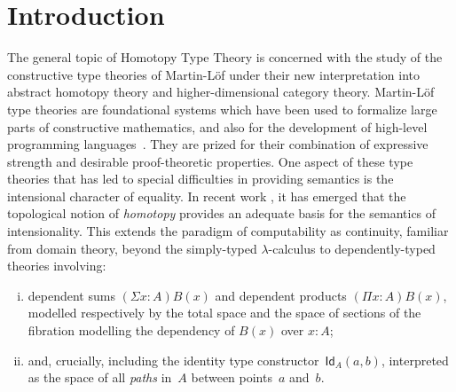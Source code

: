 \documentclass[11pt]{article}
\newcommand{\Id}{\mathsf{Id}}
\newcommand{\id}[1]{\Id_{#1}}
\theoremstyle{definition}
\begin{document}
\maketitle

\section{Introduction}


The general topic of Homotopy Type Theory is concerned with the study of the constructive type theories of Martin-L\"of under their new interpretation into abstract homotopy theory and higher-dimensional category theory. Martin-L\"of type theories are foundational systems which have been used to formalize large parts of constructive mathematics, and also for the development of high-level programming languages~\cite{MartinLofP:conmcp}.  They are prized for their combination of expressive strength and desirable proof-theoretic properties.  One aspect of these type theories that has led to special difficulties in providing semantics is the intensional character of equality.  In recent work \cite{AwodeyS:homtmi,VoevodskyV:notts,vandenBergB:topsmi,AwodeyS:typth}, it has emerged that the topological notion of \emph{homotopy} provides an adequate basis for the semantics of intensionality.  This extends the paradigm of computability as continuity, familiar from domain theory, beyond the simply-typed 
$\lambda$-calculus to dependently-typed theories involving:\begin{enumerate}[(i)]
\item dependent sums $(\Sigma x\colon\!{A})B(x)$ and dependent products $(\Pi x\colon\!{A})B(x)$, modelled respectively by the total space and the space of sections of the fibration modelling the dependency of $B(x)$ over $ x : A$; \item
and, crucially, including the identity type constructor~$\id{A}(a,b)$, interpreted as the space of all \emph{paths} in~$A$ between points~$a$ and~$b$. \end{enumerate}
\end{document}
